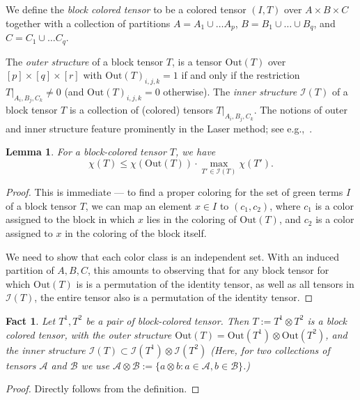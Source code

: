\documentclass[10pt,a4paper]{article}
\newtheorem{fact}[theorem]{Fact}
\newtheorem{lemma}[theorem]{Lemma}
\newcommand{\cI}{\mathcal{I}}
\newcommand{\Inn}{\cI}
\newcommand{\Out}{\mathrm{Out}}
\newcommand{\jnote}[1]{\todo[inline, color=blue!30!white]{#1 \\ -\textsc{Jarek}}}
\begin{document}
We define the \emph{block colored tensor} to be a colored tensor $(I, T)$ over $A \times B \times C$ together with a collection of partitions $A = A_1 \cup \ldots A_p$, $B = B_1 \cup \ldots \cup B_q$, and $C = C_1 \cup \ldots C_q$.

The \emph{outer structure} of a block tensor $T$, is a tensor $\Out(T)$ over $[p] \times [q] \times [r]$ with $
\Out(T)_{i,j,k} = 1$ if and only if the restriction $T|_{A_i, B_j, C_k} \not= 0$ (and $\Out(T)_{i,j,k} = 0$ otherwise). The \emph{inner structure} $\Inn(T)$ of a block tensor $T$ is a collection of (colored) tensors $T|_{A_i, B_j, C_k}$. The notions of outer and inner structure feature prominently in the Laser method; see e.g.,~\cite[Section 8]{B13}.

\begin{lemma}
\label{lem:block-coloring}
For a block-colored tensor $T$, we have
\begin{equation*}
    \chi(T) \leq \chi(\Out(T)) \cdot \max_{T' \in \Inn(T)} \chi(T').
\end{equation*}
\end{lemma}
\begin{proof}
    This is immediate --- to find a proper coloring for the set of green terms $I$ of a block tensor $T$, we can map an element $x \in I$ to $(c_1, c_2)$, where $c_1$ is a color assigned to the block in which $x$ lies in the coloring of $\Out(T)$, and $c_2$ is a color assigned to $x$ in the coloring of the block itself.

    We need to show that each color class is an independent set. With an induced partition of $A, B, C$, this amounts to observing that for any block tensor for which $\Out(T)$ is is a permutation of the identity tensor, as well as all tensors in $\Inn(T)$, the entire tensor also is a permutation of the identity tensor. 
\end{proof}

\begin{fact}
\label{fct:block-product}
Let $T^1, T^2$ be a pair of block-colored tensor. Then $T := T^1 \otimes T^2$ is a block colored tensor, with the outer structure $\Out(T) = \Out(T^1) \otimes \Out(T^2)$, and the inner structure $\Inn(T) \subset \Inn(T^1) \otimes \Inn(T^2)$ (Here, for two collections of tensors $\mathcal{A}$ and $\mathcal{B}$ we use $\mathcal{A} \otimes \mathcal{B} := \{ a \otimes b : a \in \mathcal{A}, b\in \mathcal{B}\}$.)
\end{fact}
\begin{proof}
    Directly follows from the definition.
\end{proof}
\end{document}
